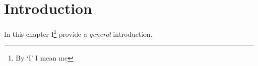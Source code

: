 \chapter{Introduction}
\label{ch:intro}

In this chapter I\footnote{By `I' I mean me} provide a \emph{general} introduction.